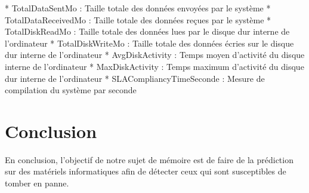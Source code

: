 \newline
* TotalDataSentMo :  Taille totale des données envoyées par le système
\newline
* TotalDataReceivedMo :  Taille totale des données reçues par le système
\newline
* TotalDiskReadMo : Taille totale des données lues par le disque dur interne de l'ordinateur
\newline
* TotalDiskWriteMo : Taille totale des données écries sur le disque dur interne de l'ordinateur
\newline
* AvgDiskActivity : Temps moyen d'activité du disque interne de l'ordinateur 
\newline
* MaxDiskActivity : Temps maximum d'activité du disque dur interne de l'ordinateur 
\newline
* SLACompliancyTimeSeconde : Mesure de compilation du système par seconde


\section{Conclusion} 
En conclusion, l'objectif de notre sujet de mémoire est de faire de la prédiction sur des matériels informatiques afin de détecter ceux qui sont susceptibles de tomber en panne.


